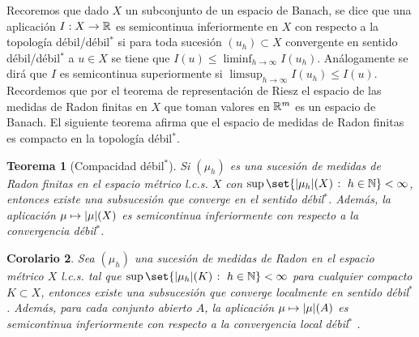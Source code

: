 \documentclass[a4paper,11pt,spanish, twoside, leqno]{tfm-uam}
\newtheorem{teo}{Teorema}[chapter]
\newtheorem{cor}[teo]{Corolario}
\begin{document}
Recoremos que dado $X$ un subconjunto de un espacio de Banach, se dice que una aplicación $I: X \to \mathbb{R}$ es semicontinua inferiormente en $X$ con respecto a la topología débil/débil$^{*}$ si para toda sucesión $(u_{h})\subset X$ convergente en sentido débil/débil$^{*}$ a $u\in X$ se tiene que $I(u)\leq \liminf_{h\to \infty} I(u_{h})$. Análogamente se dirá que $I$ es semicontinua superiormente si $\limsup_{h\to \infty} I(u_{h})\leq I(u)$. Recordemos que por el teorema de representación de Riesz el espacio de las medidas de Radon finitas en $X$ que toman valores en $\mathbb{R}^{m}$ es un espacio de Banach. El siguiente teorema afirma que el espacio de medidas de Radon finitas es compacto en la topología débil$^{*}$.
\begin{teo}[Compacidad débil$^{*}$]\label{teo:compacidad débil*}
Si $(\mu_{h})$ es una sucesión de medidas de Radon finitas en el espacio métrico l.c.s. $X$ con $\sup\set{\abs{\mu_{h}}(X)\given h\in \N}<\infty$, entonces existe una subsucesión que converge en el sentido débil$^{*}$. Además, la aplicación $\mu \mapsto \lvert\mu\rvert(X)$ es semicontinua inferiormente con respecto a la convergencia débil$^{*}$.
\end{teo}

\begin{cor}
Sea $(\mu_{h})$ una sucesión de medidas de Radon en el espacio métrico $X$ l.c.s. tal que $\sup\set{\abs{\mu_{h}}(K)\given h\in \N}<\infty$ para cualquier compacto $K\subset X$, entonces existe una subsucesión que converge localmente en sentido débil$^{*}$. Además, para cada conjunto abierto $A$, la aplicación $\mu \mapsto \lvert\mu\rvert(A)$ es semicontinua inferiormente con respecto a la convergencia local débil$^{*}$ .    
\end{cor}
\end{document}
